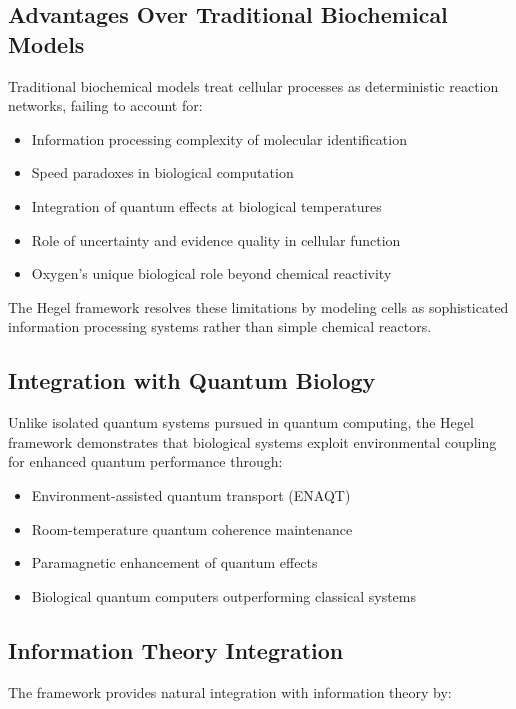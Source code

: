 \documentclass[12pt,a4paper]{article}
\begin{document}
\subsection{Advantages Over Traditional Biochemical Models}

Traditional biochemical models treat cellular processes as deterministic reaction networks, failing to account for:

\begin{itemize}
\item Information processing complexity of molecular identification
\item Speed paradoxes in biological computation
\item Integration of quantum effects at biological temperatures
\item Role of uncertainty and evidence quality in cellular function
\item Oxygen's unique biological role beyond chemical reactivity
\end{itemize}

The Hegel framework resolves these limitations by modeling cells as sophisticated information processing systems rather than simple chemical reactors.

\subsection{Integration with Quantum Biology}

Unlike isolated quantum systems pursued in quantum computing, the Hegel framework demonstrates that biological systems exploit environmental coupling for enhanced quantum performance through:

\begin{itemize}
\item Environment-assisted quantum transport (ENAQT)
\item Room-temperature quantum coherence maintenance
\item Paramagnetic enhancement of quantum effects
\item Biological quantum computers outperforming classical systems
\end{itemize}

\subsection{Information Theory Integration}

The framework provides natural integration with information theory by:
\end{document}
